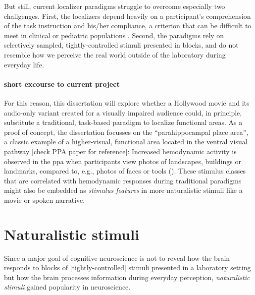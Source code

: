 But still, current localizer paradigms struggle to overcome especially two
challgenges.
%
First, the localizers depend heavily on a participant's comprehension of the
task instruction and his/her compliance, a criterion that can be difficult to
meet in clinical or pediatric populations \citep{eickhoff2020towards,
vanderwal2015inscapes, vanderwal2019movies}.
Second, the paradigms rely on selectively sampled, tightly-controlled stimuli
presented in blocks, and do not resemble how we perceive the real world outside
of the laboratory during everyday life.


\paragraph{short excourse to current project}


%
For this reason, this dissertation will explore whether a Hollywood movie and
its audio-only variant created for a visually impaired audience could, in
principle, substitute a traditional, task-based paradigm to localize functional
areas.
%
As a proof of concept, the dissertation focusses on the ``parahippocampal place
area'', a classic example of a higher-visual, functional area
\citep{epstein1998ppa, epstein1999parahippocampal} located in the ventral visual
pathway [check PPA paper for reference]:
Increased hemodynamic activity is observed in the \ac{ppa} when participants
view photos of landscapes, buildings or landmarks, compared to, e.g., photos of
faces or tools (\citep[see reviews][]{epstein2014neural, aminoff2013role}).
%
These stimulus classes that are correlated with hemodynamic responses during
traditional paradigms might also be embedded as \textit{stimulus features} in
more naturalistic stimuli like a movie or spoken narrative.


\section{Naturalistic stimuli}
%
Since a major goal of cognitive neuroscience is not to reveal how the brain
responds to blocks of [tightly-controlled] stimuli presented in a laboratory
setting but how the brain processes information during everyday perception,
\textit{naturalistic stimuli} gained popularity in neuroscience.


